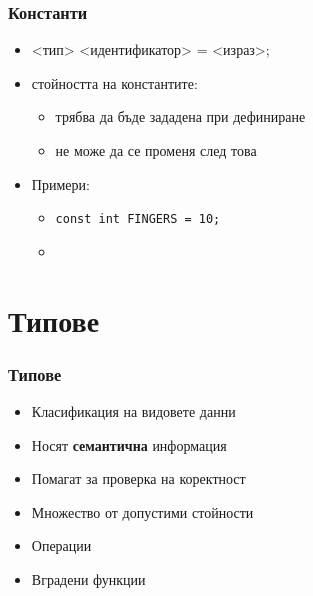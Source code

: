\documentclass[alsotrans]{beamerswitch}
\begin{document}
\begin{frame}[fragile]
  \frametitle{Константи}
  \begin{itemize}[<+->]
  \item {} <тип> <идентификатор> \tta= <израз>\tta;
  \item стойността на константите:
    \begin{itemize}
    \item \alert{трябва} да бъде зададена при дефиниране
    \item \alert{не може} да се променя след това
    \end{itemize}
  \item Примери:
    \begin{itemize}
    \item \lstinline{const int FINGERS = 10;}
    \item {}
    \end{itemize}
  \end{itemize}
\end{frame}

\section{Типове}

\begin{frame}
  \frametitle{Типове}
  \begin{itemize}[<+->]
  \item Класификация на видовете данни
  \item Носят \textbf{семантична} информация
  \item Помагат за проверка на коректност
  \item Множество от допустими стойности
  \item Операции
  \item Вградени функции
  \end{itemize}
\end{frame}
\end{document}
